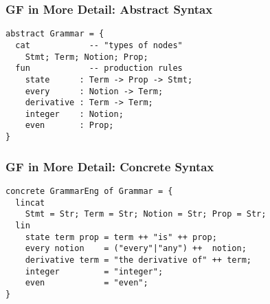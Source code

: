 \begin{frame}[fragile]
    \frametitle{GF in More Detail: Abstract Syntax}
    \centering
    

    \begin{lstlisting}[language=GF]
abstract Grammar = {
  cat            -- "types of nodes"
    Stmt; Term; Notion; Prop;
  fun            -- production rules
    state      : Term -> Prop -> Stmt;
    every      : Notion -> Term;
    derivative : Term -> Term;
    integer    : Notion;
    even       : Prop;
}
    \end{lstlisting}
\end{frame}


\begin{frame}[fragile]
    \frametitle{GF in More Detail: Concrete Syntax}
    \centering
    

    \begin{lstlisting}[language=GF]
concrete GrammarEng of Grammar = {
  lincat
    Stmt = Str; Term = Str; Notion = Str; Prop = Str;
  lin
    state term prop = term ++ "is" ++ prop;
    every notion    = ("every"|"any") ++  notion;
    derivative term = "the derivative of" ++ term;
    integer         = "integer";
    even            = "even";
}
    \end{lstlisting}
\end{frame}
